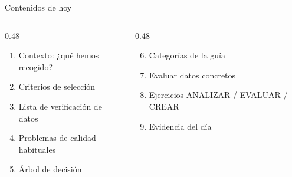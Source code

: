 \documentclass[aspectratio=169, 10pt, spanish]{beamer}
\begin{document}
\begin{frame}[plain]
  \titlepage
\end{frame}

\begin{frame}{Contenidos de hoy}
  \begin{columns}[t]
    \begin{column}{0.48\textwidth}
      \begin{enumerate}
        \item Contexto: ¿qué hemos recogido?
        \item Criterios de selección
        \item Lista de verificación de datos
        \item Problemas de calidad habituales
        \item Árbol de decisión
      \end{enumerate}
    \end{column}
    \begin{column}{0.48\textwidth}
      \begin{enumerate}\setcounter{enumi}{5}
        \item Categorías de la guía
        \item Evaluar datos concretos
        \item Ejercicios ANALIZAR / EVALUAR / CREAR
        \item Evidencia del día
      \end{enumerate}
    \end{column}
  \end{columns}
  \vspace{0.4cm}
  \begin{center}
  \end{center}
\end{frame}

\end{document}
